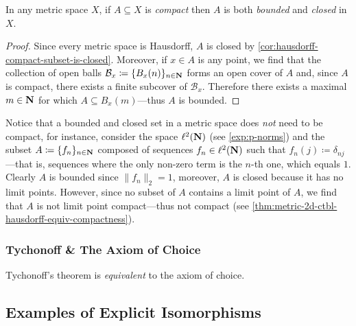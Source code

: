 \begin{proposition}
    \label{prop:metric-space-compact-implies-bounded-closed}
    In any metric space \(X\), if \(A \subseteq X\) is \emph{compact} then \(A\) is
    both \emph{bounded} and \emph{closed} in \(X\).
\end{proposition}

\begin{proof}
    Since every metric space is Hausdorff, \(A\) is closed by
    \cref{cor:hausdorff-compact-subset-is-closed}. Moreover, if \(x \in A\) is any
    point, we find that the collection of open balls
    \(\mathcal{B}_x \coloneq \{B_x(n)\}_{n \in \mathbf{N}}\) forms an open cover of \(A\)
    and, since \(A\) is compact, there exists a finite subcover of
    \(\mathcal{B}_x\). Therefore there exists a maximal \(m \in \mathbf{N}\) for which
    \(A \subseteq B_x(m)\)---thus \(A\) is bounded.
\end{proof}

\begin{remark}
    \label{rem:closed-and-bounded-not-compact}
    Notice that a bounded and closed set in a metric space does \emph{not} need to
    be compact, for instance, consider the space \(\ell^2(\mathbf{N})\) (see
    \cref{exp:p-norms}) and the subset \(A \coloneq \{f_n\}_{n \in \mathbf{N}}\) composed of
    sequences \(f_n \in \ell^2(\mathbf{N})\) such that
    \(f_n(j) \coloneq \delta_{n j}\)---that is, sequences where the only non-zero
    term is the \(n\)-th one, which equals \(1\). Clearly \(A\) is bounded since
    \(\| f_{n} \|_2 = 1\), moreover, \(A\) is closed because it has no limit
    points. However, since no subset of \(A\) contains a limit point of \(A\), we
    find that \(A\) is not limit point compact---thus not compact (see
    \cref{thm:metric-2d-ctbl-hausdorff-equiv-compactness}).
\end{remark}

\subsubsection{Tychonoff \& The Axiom of Choice}

\begin{theorem}
    \label{thm:tychonoff-equivalent-choice}
    Tychonoff's theorem is \emph{equivalent} to the axiom of choice.
\end{theorem}


\subsection{Examples of Explicit Isomorphisms}

